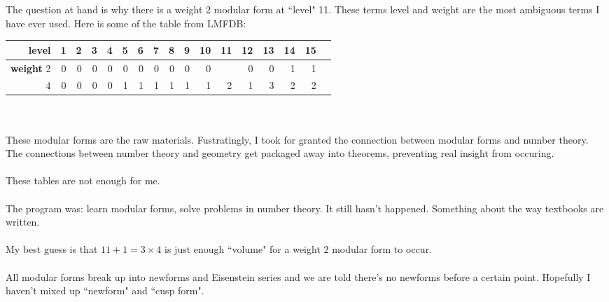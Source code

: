 \documentclass[12pt]{article}
\begin{document}
\newpage

\noindent The question at hand is why there is a weight 2 modular form at ``level" 11.  These terms level and weight are the most ambiguous terms I have ever used.  Here is some of the table from LMFDB: \\

\begin{tabular}{r|rrrrrrrrrrrrrrrr}

 \textbf{level} & 1 & 2 & 3 & 4 & 5 & 6 & 7 & 8 & 9 & 10 & 11 & 12 & 13 & 14 & 15 \\ \hline
\textbf{weight }2 & 0 & 0 & 0 & 0 & 0 & 0 & 0 & 0 & 0 & 0  & \color{red!60!white}{\textbf{1}}  & 0  & 0  &  1 &  1 \\ 
4 & 0 & 0 & 0 & 0 & 1 & 1 & 1 & 1 & 1 & 1 & 2  & 1  & 3  & 2  &  2 
\end{tabular} \\ \\
These modular forms are the raw materials.  Fustratingly, I took for granted the connection between modular forms and number theory.  The connections between number theory and geometry get packaged away into theorems, preventing real insight from occuring. \\ \\
These tables are not enough for me.  \\ \\
The program was: learn modular forms, solve problems in number theory.  It still hasn't happened.  Something about the way textbooks are written. \\ \\
My best guess is that $11 + 1 = 3 \times 4$ is just enough ``volume" for a weight 2 modular form to occur.  \\ \\ 
All modular forms break up into newforms and Eisenstein series and we are told there's no newforms before a certain point.  Hopefully I haven't mixed up ``newform" and ``cusp form".  \\ 
\end{document}

